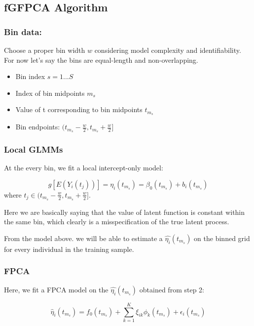 \documentclass[
]{article}
\providecommand{\tightlist}{%
  \setlength{\itemsep}{0pt}\setlength{\parskip}{0pt}}
\begin{document}
\hypertarget{fgfpca-algorithm}{%
\subsection{fGFPCA Algorithm}\label{fgfpca-algorithm}}

\hypertarget{bin-data}{%
\subsubsection{Bin data:}\label{bin-data}}

Choose a proper bin width \(w\) considering model complexity and
identifiability. For now let's say the bins are equal-length and
non-overlapping.

\begin{itemize}
\tightlist
\item
  Bin index \(s = 1...S\)
\item
  Index of bin midpoints \(m_s\)
\item
  Value of t corresponding to bin midpoints \(t_{m_s}\)
\item
  Bin endpoints: \((t_{m_s}-\frac{w}{2}, t_{m_s}+\frac{w}{2}]\)
\end{itemize}

\hypertarget{local-glmms}{%
\subsubsection{Local GLMMs}\label{local-glmms}}

At the every bin, we fit a local intercept-only model:

\[g[E(Y_i(t_j))] =\eta_i(t_{m_s})= \beta_0(t_{m_s})+b_i(t_{m_s})\] where
\(t_j \in (t_{m_s}-\frac{w}{2}, t_{m_s}+\frac{w}{2}]\).

Here we are basically saying that the value of latent function is
constant within the same bin, which clearly is a misspecification of the
true latent process.

From the model above. we will be able to estimate a
\(\hat{\eta_i}(t_{m_s})\) on the binned grid for every individual in the
training sample.

\hypertarget{fpca}{%
\subsubsection{FPCA}\label{fpca}}

Here, we fit a FPCA model on the \(\hat{\eta_i}(t_{m_s})\) obtained from
step 2:

\[\hat{\eta}_i(t_{m_s}) = f_0(t_{m_s})+\sum_{k=1}^K\xi_{ik}\phi_{k}(t_{m_s})+\epsilon_i(t_{m_s})\]
\end{document}
